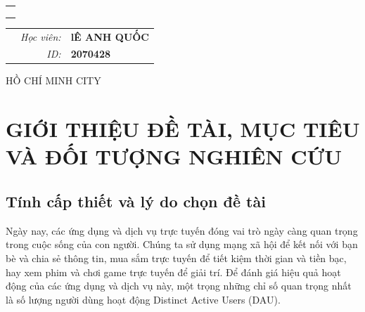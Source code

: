 \documentclass[a4paper,11pt]{article}
\theoremstyle{mytheor}
\begin{document}
\begin{titlepage}
\begin{center}
\begin{tabular}{c}
\\
\\

\\
\\

\end{tabular}
\end{center}

\vspace{1cm}

\begin{table}[h]
\begin{tabular}{rrl}
\hspace{5.6cm} 
&\textit{Học viên: } & \textbf{lÊ ANH QUỐC}\\
&\textit{ID: } & \textbf{2070428}\\

\end{tabular}
\end{table}
\vspace{1cm}
\begin{center}
{\footnotesize HỒ CHÍ MINH CITY}
\end{center}
\end{titlepage}




\renewcommand{\contentsname}{Content}
\newpage
\vspace{1cm}
\tableofcontents
\newpage
\section{GIỚI THIỆU ĐỀ TÀI, MỤC TIÊU VÀ ĐỐI TƯỢNG NGHIÊN CỨU}
\subsection{Tính cấp thiết và lý do chọn đề tài}
\hspace{2em}Ngày nay, các ứng dụng và dịch vụ trực tuyến đóng vai trò ngày càng quan trọng trong cuộc sống của con người. 
Chúng ta sử dụng mạng xã hội để kết nối với bạn bè và chia sẻ thông tin, mua sắm trực tuyến để tiết kiệm thời gian và tiền bạc, 
hay xem phim và chơi game trực tuyến để giải trí. Để đánh giá hiệu quả hoạt động của các ứng dụng và dịch vụ này, 
một trọng những chỉ số quan trọng nhất là số lượng người dùng hoạt động Distinct Active Users (DAU).
\end{document}
